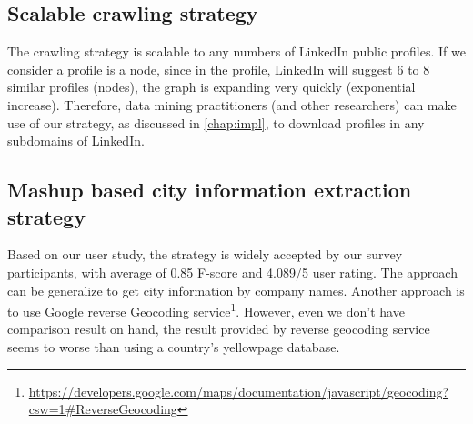 \subsection{Scalable crawling strategy}
The crawling strategy is scalable to any numbers of LinkedIn public profiles. If we consider a profile is a node, since in the profile, LinkedIn will suggest 6 to 8 similar profiles (nodes), the graph is expanding very quickly (exponential increase). Therefore, data mining practitioners (and other researchers) can make use of our strategy, as discussed in \autoref{chap:impl}, to download profiles in any subdomains of LinkedIn.

\subsection{Mashup based city information extraction strategy}

Based on our user study, the strategy is widely accepted by our survey participants, with average of 0.85 F-score and 4.089/5 user rating. The approach can be generalize to get city information by company names. Another approach is to use Google reverse Geocoding service\footnote{\url{https://developers.google.com/maps/documentation/javascript/geocoding?csw=1\#ReverseGeocoding}}. However, even we don't have comparison result on hand, the result provided by reverse geocoding service seems to worse than using a country's yellowpage database.
